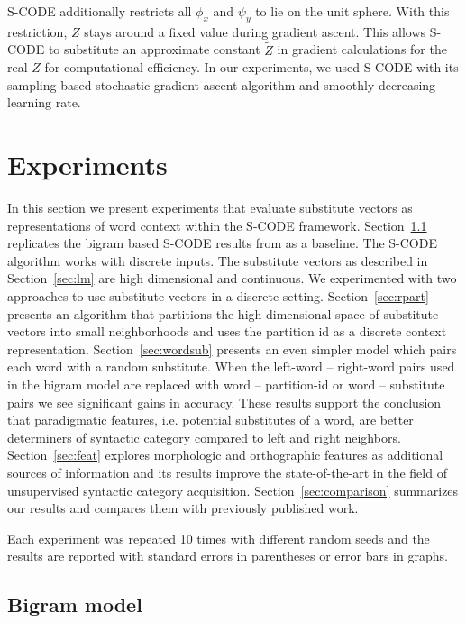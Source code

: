 \documentclass[11pt]{article}
\begin{document}
S-CODE \cite{maron2010sphere} additionally restricts all $\phi_x$ and
$\psi_y$ to lie on the unit sphere.  With this restriction, $Z$ stays
around a fixed value during gradient ascent.  This allows S-CODE to
substitute an approximate constant $\tilde{Z}$ in gradient
calculations for the real $Z$ for computational efficiency.  In our
experiments, we used S-CODE with its sampling based stochastic
gradient ascent algorithm and smoothly decreasing learning
rate.

\section{Experiments}
\label{sec:exp}

In this section we present experiments that evaluate substitute
vectors as representations of word context within the S-CODE
framework.  Section~\ref{sec:bigram} replicates the bigram based
S-CODE results from \cite{maron2010sphere} as a baseline.  The S-CODE
algorithm works with discrete inputs.  The substitute vectors as
described in Section~\ref{sec:lm} are high dimensional and continuous.
We experimented with two approaches to use substitute vectors in a
discrete setting.  Section~\ref{sec:rpart} presents an algorithm that
partitions the high dimensional space of substitute vectors into small
neighborhoods and uses the partition id as a discrete context
representation.  Section~\ref{sec:wordsub} presents an even simpler
model which pairs each word with a random substitute.  When the
left-word -- right-word pairs used in the bigram model are replaced
with word -- partition-id or word -- substitute pairs we see
significant gains in accuracy.  These results support the conclusion
that paradigmatic features, i.e. potential substitutes of a word, are
better determiners of syntactic category compared to left and right
neighbors.  Section~\ref{sec:feat} explores morphologic and
orthographic features as additional sources of information and its
results improve the state-of-the-art in the field of unsupervised
syntactic category acquisition.  Section~\ref{sec:comparison}
summarizes our results and compares them with previously published
work.

Each experiment was repeated 10 times with different random seeds and
the results are reported with standard errors in parentheses or error
bars in graphs.

\subsection{Bigram model}\label{sec:bigram}
\end{document}
